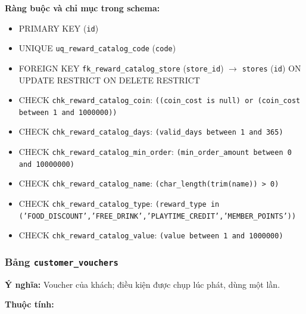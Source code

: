 \textbf{Ràng buộc và chỉ mục trong schema:}

\begin{itemize}

\item PRIMARY KEY (\texttt{id})

\item UNIQUE \texttt{uq\_reward\_catalog\_code} (\texttt{code})

\item FOREIGN KEY \texttt{fk\_reward\_catalog\_store} (\texttt{store\_id}) $\rightarrow$ \texttt{stores} (\texttt{id}) ON UPDATE RESTRICT ON DELETE RESTRICT

\item CHECK \texttt{chk\_reward\_catalog\_coin}: \texttt{((coin\_cost is null) or (coin\_cost between 1 and 1000000))}

\item CHECK \texttt{chk\_reward\_catalog\_days}: \texttt{(valid\_days between 1 and 365)}

\item CHECK \texttt{chk\_reward\_catalog\_min\_order}: \texttt{(min\_order\_amount between 0 and 10000000)}

\item CHECK \texttt{chk\_reward\_catalog\_name}: \texttt{(char\_length(trim(name)) > 0)}

\item CHECK \texttt{chk\_reward\_catalog\_type}: \texttt{(reward\_type in ('FOOD\_DISCOUNT','FREE\_DRINK','PLAYTIME\_CREDIT','MEMBER\_POINTS'))}

\item CHECK \texttt{chk\_reward\_catalog\_value}: \texttt{(value between 1 and 1000000)}

\end{itemize}

\subsubsection{Bảng \texttt{customer\_vouchers}}

\textbf{Ý nghĩa:} Voucher của khách; điều kiện được chụp lúc phát, dùng một lần.\par

\textbf{Thuộc tính:}

